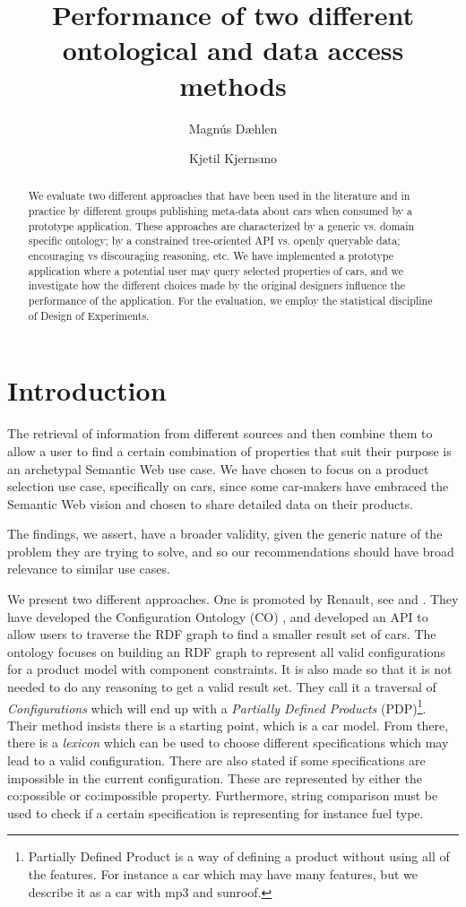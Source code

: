 \documentclass{llncs}
\title{Performance of two different ontological and data access methods}
\author{Magn\'{u}s D\ae hlen \and Kjetil Kjernsmo}
\institute{Department of Informatics,
Postboks 1080 Blindern,
N-0316 Oslo, Norway \email{\{magnudae,kjekje\}@ifi.uio.no} }
\begin{document}
\maketitle

\begin{abstract}
  We evaluate two different approaches that have been used in the
  literature and in practice by different groups publishing meta-data
  about cars when consumed by a prototype application. These
  approaches are characterized by a generic vs. domain specific
  ontology; by a constrained tree-oriented API vs. openly queryable
  data; encouraging vs discouraging reasoning, etc.  We have
  implemented a prototype application where a potential user may query
  selected properties of cars, and we investigate how the different
  choices made by the original designers influence the performance of
  the application. For the evaluation, we employ the statistical
  discipline of Design of Experiments.

\end{abstract}

\section{Introduction}

The retrieval of information from different sources and then combine
them to allow a user to find a certain combination of properties that
suit their purpose is an archetypal Semantic Web use case. We have
chosen to focus on a product selection use case, specifically on cars,
since some car-makers have embraced the Semantic Web vision and chosen
to share detailed data on their products.

The findings, we assert, have a broader validity, given the generic
nature of the problem they are trying to solve, and so our
recommendations should have broad relevance to similar use cases.

We present two different approaches. One is promoted by Renault, see
\cite{SemWebAppRes} and \cite{ren1}. They have developed the
Configuration Ontology (CO) \cite{confOnt}, and developed an API to allow
users to traverse the RDF graph to find a smaller result set of cars.
The ontology focuses on building an RDF graph to represent all valid
configurations for a product model with component constraints.  It is
also made so that it is not needed to do any reasoning to get a valid
result set.  They call it a traversal of \emph{Configurations} which
will end up with a \emph{Partially Defined Products}
(PDP)\footnote{Partially Defined Product is a way of defining a
  product without using all of the features. For instance a car which
  may have many features, but we describe it as a car with mp3 and
  sunroof.}.  Their method insists there is a starting point, which is
a car model. From there, there is a \emph{lexicon} which can be used
to choose different specifications which may lead to a valid
configuration. There are also stated if some specifications are
impossible in the current configuration.  These are represented by
either the \textsf{co:possible} or \textsf{co:impossible}
property. Furthermore, string comparison must be used to check if a
certain specification is representing for instance fuel type.
\end{document}

